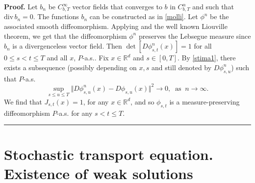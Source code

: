 \documentclass[a4paper,10pt]{article}
\newenvironment{proof}[1][Proof]{\textbf{#1.} }{\ \rule{0.5em}{0.5em}}
\begin{document}
\begin{proof}
Let $b_{n}$ be $C_{b,T}^{\infty}$ vector fields that converges to
$b$ in $C_{b,T}^{{\alpha}}$ and such that
${\mathrm{div}\,}b_{n}=0$. The functions $b_{n}$ can be
constructed as in \eqref{molli}.  Let $\phi^{n}$ be the associated
smooth diffeomorphism. Applying \cite[Theorem II.3.1]{K} and the
well known Liouville theorem, we get that the diffeomorphism
$\phi^{n}$ preserves the Lebsegue measure since $b_{n}$ is a
divergenceless vector field.
%
%
%
%
%
%
%
Then $\det [D\phi_{s,t}^{n}(x)]=1$ for all $0\leq s<t\leq T$ and
all $x$, $P$-a.s.. Fix $x\in{\mathbb{R}}^{d}$ and $s \in[0,T]$. By
\eqref{stima1}, there exists a subsequence (possibly depending on
$x,s$ and still denoted by $D\phi_{s,u}^{n}$) such that $P$-a.s.
\[
\sup_{s\leq u\leq T}\Vert D\phi_{s,u}^{n}(x)-D\phi_{s,u}(x)\Vert
^{2}\rightarrow0,\;\;\mbox{as}\;\;n\rightarrow\infty.
\]
We find that $J_{s,t}(x)=1$, for any $x\in{\mathbb{R}}^{d}$,  and
so $\phi_{s,t}$ is a measure-preserving diffeomorphism $P$-a.s.
for any $s<t\leq T$.
\end{proof}

%
%
%
%
%
%
%

%
%
%
%
%
%
%

\section{Stochastic transport equation. Existence of weak solutions}

\label{sec:transp}
%
%
%
%
%
%
%

\end{document}

